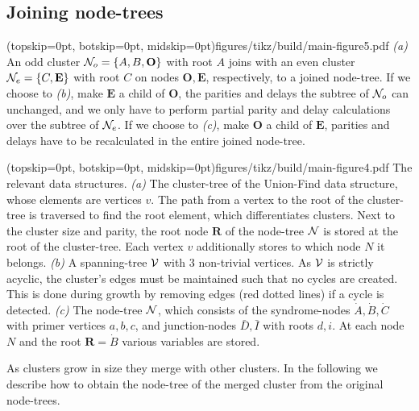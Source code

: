 \subsection{Joining node-trees}\label{sec:nodejoin}

\Figure[b](topskip=0pt, botskip=0pt, midskip=0pt){figures/tikz/build/main-figure5.pdf}{
    \emph{(a)} An odd cluster $\mathcal{N}_o=\{A, B, \mathbf{O}\}$ with root $A$ joins with an even cluster $\mathcal{N}_e=\{C, \mathbf{E}\}$ with root $C$ on nodes $\mathbf{O}, \mathbf{E}$, respectively, to a joined node-tree. If we choose to \emph{(b)}, make $\mathbf{E}$ a child of $\mathbf{O}$, the parities and delays the subtree of $\mathcal{N}_o$ can unchanged, and we only have to perform partial parity and delay calculations over the subtree of $\mathcal{N}_e$. If we choose to \emph{(c)}, make $\mathbf{O}$ a child of $\mathbf{E}$, parities and delays have to be recalculated in the entire joined node-tree. \label{fig:inversion}}

\Figure[tb](topskip=0pt, botskip=0pt, midskip=0pt){figures/tikz/build/main-figure4.pdf}{
    The relevant data structures. \emph{(a)} The cluster-tree of the Union-Find data structure, whose elements are vertices $v$. The path from a vertex to the root of the cluster-tree is traversed to find the root element, which differentiates clusters. Next to the cluster size and parity, the root node $\mathbf{R}$ of the node-tree $\mathcal{N}$ is stored at the root of the cluster-tree. Each vertex $v$ additionally stores to which node $N$ it belongs. \emph{(b)} A spanning-tree $\mathcal{V}$ with 3 non-trivial vertices. As $\mathcal{V}$ is strictly acyclic, the cluster's edges must be maintained such that no cycles are created. This is done during growth by removing edges (red dotted lines) if a cycle is detected. \emph{(c)} The node-tree $\mathcal{N}$, which consists of the syndrome-nodes $\dot{A}, \dot{B}, \dot{C}$ with primer vertices $a, b, c$, and junction-nodes $\bar{D}, \bar{I}$ with roots $d,i$. At each node $N$ and the root $\mathbf{R}=\dot{B}$ various variables are stored.\label{fig:nodetypes}}

As clusters grow in size they merge with other clusters. 
In the following we describe how to obtain the node-tree of the merged cluster from the original node-trees. %

